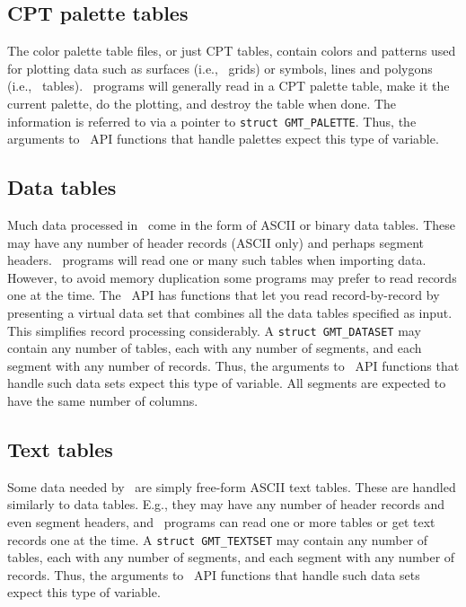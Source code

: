\documentclass[11pt]{report}
\begin{document}
\subsection{CPT palette tables}

The color palette table files, or just CPT tables, contain colors and patterns used for plotting
data such as surfaces (i.e., \GMT\ grids) or symbols, lines and polygons (i.e., \GMT\ tables).
\GMT\ programs will generally read in a CPT
palette table, make it the current palette, do the plotting, and destroy the table when done.
The information is referred to via a pointer to \texttt{struct GMT\_PALETTE}.  Thus, the
arguments to \GMT\ API functions that handle palettes expect this type of variable.

\subsection{Data tables}

Much data processed in \GMT\ come in the form of ASCII or binary data tables.  These may
have any number of header records (ASCII only) and perhaps segment headers.  \GMT\ programs will
read one or many such tables when importing data.  However, to avoid memory duplication some programs may prefer to read
records one at the time.  The \GMT\ API has functions that let you read record-by-record
by presenting a virtual data set that combines all the data tables specified as input.
This simplifies record processing considerably.  A \texttt{struct GMT\_DATASET} may contain
any number of tables, each with any number of segments, and each segment with any number of records.   Thus, the
arguments to \GMT\ API functions that handle such data sets expect this type of variable.  All segments
are expected to have the same number of columns.

\subsection{Text tables}

Some data needed by \GMT\ are simply free-form ASCII text tables.  These are handled
similarly to data tables.  E.g., they may have any number of header records and even segment headers,
and \GMT\ programs can read one or more tables or get text records one at the time.
A \texttt{struct GMT\_TEXTSET} may contain
any number of tables, each with any number of segments, and each segment with any number of records.   Thus, the
arguments to \GMT\ API functions that handle such data sets expect this type of variable.
\end{document}
